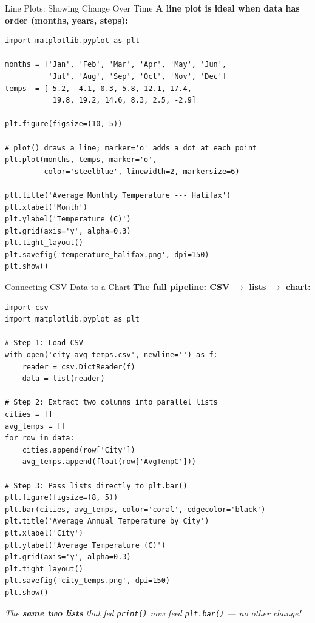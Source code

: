 \documentclass{csbeamer}
\begin{document}
\begin{frame}[fragile]{Line Plots: Showing Change Over Time}
    \textbf{A line plot is ideal when data has \textcolor{marigold}{order} (months, years, steps):}

    \begin{lstlisting}
import matplotlib.pyplot as plt

months = ['Jan', 'Feb', 'Mar', 'Apr', 'May', 'Jun',
          'Jul', 'Aug', 'Sep', 'Oct', 'Nov', 'Dec']
temps  = [-5.2, -4.1, 0.3, 5.8, 12.1, 17.4,
           19.8, 19.2, 14.6, 8.3, 2.5, -2.9]

plt.figure(figsize=(10, 5))

# plot() draws a line; marker='o' adds a dot at each point
plt.plot(months, temps, marker='o',
         color='steelblue', linewidth=2, markersize=6)

plt.title('Average Monthly Temperature --- Halifax')
plt.xlabel('Month')
plt.ylabel('Temperature (C)')
plt.grid(axis='y', alpha=0.3)
plt.tight_layout()
plt.savefig('temperature_halifax.png', dpi=150)
plt.show()
    \end{lstlisting}
\end{frame}

\begin{frame}[fragile]{Connecting CSV Data to a Chart}
    \textbf{The full pipeline: CSV $\rightarrow$ lists $\rightarrow$ chart:}

    \begin{lstlisting}
import csv
import matplotlib.pyplot as plt

# Step 1: Load CSV
with open('city_avg_temps.csv', newline='') as f:
    reader = csv.DictReader(f)
    data = list(reader)

# Step 2: Extract two columns into parallel lists
cities = []
avg_temps = []
for row in data:
    cities.append(row['City'])
    avg_temps.append(float(row['AvgTempC']))

# Step 3: Pass lists directly to plt.bar()
plt.figure(figsize=(8, 5))
plt.bar(cities, avg_temps, color='coral', edgecolor='black')
plt.title('Average Annual Temperature by City')
plt.xlabel('City')
plt.ylabel('Average Temperature (C)')
plt.grid(axis='y', alpha=0.3)
plt.tight_layout()
plt.savefig('city_temps.png', dpi=150)
plt.show()
    \end{lstlisting}

    \pause
    \begin{center}
        \textit{The \textcolor{marigold}{\textbf{same two lists}} that fed \texttt{print()} now feed \texttt{plt.bar()} --- no other change!}
    \end{center}
\end{frame}
\end{document}
